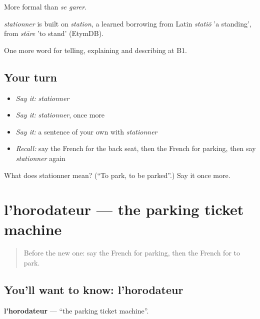 More formal than \emph{se garer}.

\begin{cousinweb}
\emph{stationner} is built on \emph{station}, a learned borrowing from Latin \emph{statiō} 'a standing', from \emph{stāre} 'to stand' (EtymDB).
\end{cousinweb}

\begin{grammarlens}[title={What you've built}]
One more word for telling, explaining and describing at B1.
\end{grammarlens}

\subsection*{Your turn}
\begin{itemize}
\raggedright
  \item \emph{Say it:} \emph{stationner}
  \item \emph{Say it:} \emph{stationner}, once more
  \item \emph{Say it:} a sentence of your own with \emph{stationner}
  \item \emph{Recall:} say the French for the back seat, then the French for parking, then say \emph{stationner} again
\end{itemize}

\begin{tcolorbox}[breakable,colback=teal!4,colframe=teal!35!black,title={Before you move on}]
What does stationner mean? (\textquotedblleft{}To park, to be parked\textquotedblright{}.) Say it once more.
\end{tcolorbox}
\section[l'horodateur]{l'horodateur — the parking ticket machine}

\label{lesson:FR-C407-horodateur}



\begin{quote}
Before the new one: say the French for parking, then the French for to park.
\end{quote}

\subsection*{You'll want to know: l'horodateur}
\textbf{l'horodateur} — \textquotedblleft{}the parking ticket machine\textquotedblright{}.

